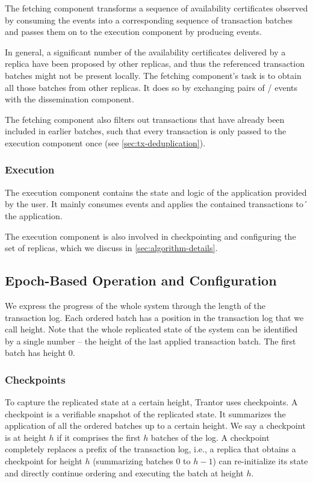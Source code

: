 \documentclass{article}
\begin{document}
The fetching component transforms a sequence of availability certificates observed by consuming the  events
into a corresponding sequence of transaction batches and passes them on to the execution component by producing  events.

In general, a significant number of the availability certificates delivered by a replica have been proposed by other replicas,
and thus the referenced transaction batches might not be present locally.
The fetching component’s task is to obtain all those batches from other replicas.
It does so by exchanging pairs of  /  events with the dissemination component.

The fetching component also filters out transactions that have already been included in earlier batches,
such that every transaction is only passed to the execution component once (see \cref{sec:tx-deduplication}).

\subsubsection{Execution}

The execution component contains the state and logic of the application provided by the user.
It mainly consumes  events and applies the contained transactions to´ the application.

The execution component is also involved in checkpointing and configuring the set of replicas, which we discuss in \cref{sec:algorithm-details}.

\subsection{Epoch-Based Operation and Configuration}

We express the progress of the whole system through the length of the transaction log.
Each ordered batch has a position in the transaction log that we call height.
Note that the whole replicated state of the system can be identified by a single number
– the height of the last applied transaction batch.
The first batch has height 0.

\subsubsection{Checkpoints}

To capture the replicated state at a certain height, Trantor uses checkpoints.
A checkpoint is a verifiable snapshot of the replicated state.
It summarizes the application of all the ordered batches up to a certain height.
We say a checkpoint is at height $h$ if it comprises the first $h$ batches of the log.
A checkpoint completely replaces a prefix of the transaction log,
i.e., a replica that obtains a checkpoint for height $h$ (summarizing batches $0$ to $h-1$)
can re-initialize its state and directly continue ordering and executing the batch at height $h$.
\end{document}
